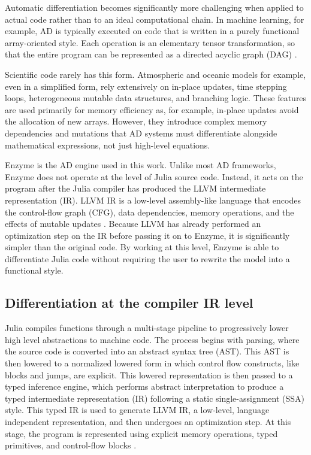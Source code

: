 Automatic differentiation becomes significantly more challenging when applied to actual code rather than to an ideal computational chain. In machine learning, for example, AD is typically executed on code that is written in a purely functional array-oriented style. Each operation is an elementary tensor transformation, so that the entire program can be represented as a directed acyclic graph (DAG) \parencite{baydin_automatic_2015}. 

Scientific code rarely has this form. Atmospheric and oceanic models for example, even in a simplified form, rely extensively on in-place updates, time stepping loops, heterogeneous mutable data structures, and branching logic. These features are used primarily for memory efficiency as, for example, in-place updates avoid the allocation of new arrays. However, they introduce complex memory dependencies and mutations that AD systems must differentiate alongside mathematical expressions, not just high-level equations.

Enzyme \parencite{moses_instead_2020} is the AD engine used in this work. Unlike most AD frameworks, Enzyme does not operate at the level of Julia source code. Instead, it acts on the program after the Julia compiler has produced the LLVM intermediate representation (IR). LLVM IR is a low-level assembly-like language that encodes the control-flow graph (CFG), data dependencies, memory operations, and the effects of mutable updates \parencite{noauthor_llvm_nodate}. Because LLVM has already performed an optimization step on the IR before passing it on to Enzyme, it is significantly simpler than the original code. By working at this level, Enzyme is able to differentiate Julia code without requiring the user to rewrite the model into a functional style.

\subsection{Differentiation at the compiler IR level}

Julia compiles functions through a multi-stage pipeline to progressively lower high level abstractions to machine code. The process begins with parsing, where the source code is converted into an abstract syntax tree (AST). This AST is then lowered to a normalized lowered form in which control flow constructs, like blocks and jumps, are explicit. This lowered representation is then passed to a typed inference engine, which performs abstract interpretation to produce a typed intermediate representation (IR) following a static single-assignment (SSA) style. This typed IR is used to generate LLVM IR, a low-level, language independent representation, and then undergoes an optimization step. At this stage, the program is represented using explicit memory operations, typed primitives, and control-flow blocks \cite{julia_developers_julia_nodate}.

